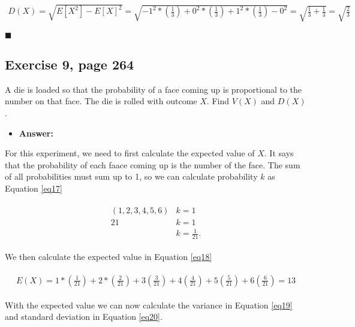 \documentclass{article}
\begin{document}
 \begin{eqnarray}
\label{eq16}
D(X) = \sqrt{E[X^2] - E[X]^2} = \sqrt{-1^2* \left(\frac{1}{3}\right)  + 0^2 * \left(\frac{1}{3}\right) + 1^2* \left(\frac{1}{3}\right) - 0^2 }=\sqrt{ \frac{1}{3} + \frac{1}{3}} =\sqrt{ \frac{2}{3}}
\end{eqnarray}


\begin{flushright}
$\blacksquare$
\end{flushright}

\subsection{Exercise 9, page 264}

A die is loaded so that the probability of a face coming up is proportional to the number on that face. The die is rolled with outcome $X$. Find $V(X)$ and $D(X)$.\\

\begin{itemize}
\item \textbf{Answer:}
\end{itemize}

For this experiment, we need to first calculate the expected value of $X$. It says that the probability of each faace coming up is the number of the face. The sum of all probabilities must sum up to 1, so we can calculate probability $k$ as Equation \ref{eq17}

 \begin{eqnarray}
\label{eq17}
\begin{split}
(1, 2, 3, 4, 5, 6)& k = 1\\
21&k = 1\\
&k = \frac{1}{21}.
\end{split}
\end{eqnarray}

We then calculate the expected value in Equation \ref{eq18}

 \begin{eqnarray}
\label{eq18}
\begin{split}
E(X) = 1* \left(\frac{1}{21}\right) + 2 * \left(\frac{2}{21}\right) + 3\left(\frac{3}{21}\right) +4\left(\frac{4}{21}\right) +5\left(\frac{5}{21}\right) +6\left(\frac{6}{21}\right) = 13
\end{split}
\end{eqnarray}

With the expected value we can now calculate the variance in Equation \ref{eq19} and standard deviation in Equation \ref{eq20}.
\end{document}
